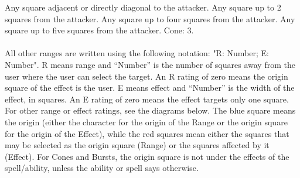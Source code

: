  Any square adjacent or directly diagonal to the attacker.\ofrow
{} Any square up to 2 squares from the attacker.\ofrow
{} Any square up to four squares from the attacker.\ofrow
{} Any square up to five squares from the attacker. \ofrow
{} Cone: 3.
%
\\\\
%
 All other ranges are written using the following notation: "R: Number; E: Number".
R means range and “Number” is the number of squares away from the user where the user can select the target. 
An R rating of zero means the origin square of the effect is the user. 
E means effect and “Number” is the width of the effect, in squares. 
An E rating of zero means the effect targets only one square. 
For other range or effect ratings, see the diagrams below.
The blue square means the origin (either the character for the origin of the Range or the origin square for the origin of
the Effect), while the red squares mean either the squares that may be selected as the origin square (Range) or the squares affected by it (Effect). For Cones and Bursts, the origin square is not under the effects of the spell/ability, unless the ability or spell says otherwise.
%
\\\\
%

